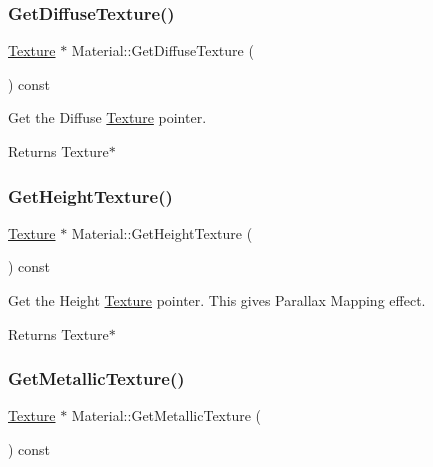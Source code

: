 \subsubsection{\texorpdfstring{Get\+Diffuse\+Texture()}{GetDiffuseTexture()}}
{\footnotesize\ttfamily \hyperlink{classTexture}{Texture} $\ast$ Material\+::\+Get\+Diffuse\+Texture (\begin{DoxyParamCaption}{ }\end{DoxyParamCaption}) const}



Get the Diffuse \hyperlink{classTexture}{Texture} pointer. 

\begin{DoxyReturn}{Returns}
Texture$\ast$ 
\end{DoxyReturn}
\mbox{\label{classMaterial_a7fee2a74eae077dfea902c05ef438326}} 
\subsubsection{\texorpdfstring{Get\+Height\+Texture()}{GetHeightTexture()}}
{\footnotesize\ttfamily \hyperlink{classTexture}{Texture} $\ast$ Material\+::\+Get\+Height\+Texture (\begin{DoxyParamCaption}{ }\end{DoxyParamCaption}) const}



Get the Height \hyperlink{classTexture}{Texture} pointer. This gives Parallax Mapping effect. 

\begin{DoxyReturn}{Returns}
Texture$\ast$ 
\end{DoxyReturn}
\mbox{\label{classMaterial_a29ba7e0e96585a71dbc639ef1f576f04}} 
\subsubsection{\texorpdfstring{Get\+Metallic\+Texture()}{GetMetallicTexture()}}
{\footnotesize\ttfamily \hyperlink{classTexture}{Texture} $\ast$ Material\+::\+Get\+Metallic\+Texture (\begin{DoxyParamCaption}{ }\end{DoxyParamCaption}) const}



